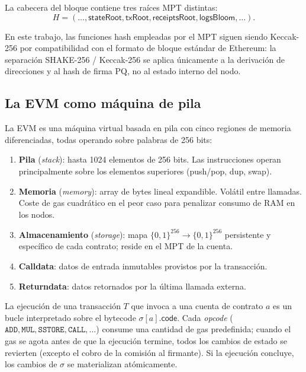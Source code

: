 La cabecera del bloque contiene tres raíces MPT distintas:
\begin{equation}
  H = (\ldots, \textsf{stateRoot}, \textsf{txRoot}, \textsf{receiptsRoot}, \textsf{logsBloom}, \ldots).
  \label{eq:header_roots}
\end{equation}

En este trabajo, las funciones hash empleadas por el MPT siguen siendo Keccak-256 por compatibilidad con el formato de bloque estándar de Ethereum: la separación SHAKE-256 / Keccak-256 se aplica únicamente a la derivación de direcciones y al hash de firma PQ, no al estado interno del nodo.

\subsection{La EVM como máquina de pila}
\label{sec:evm_arch}

La EVM es una máquina virtual basada en pila con cinco regiones de memoria diferenciadas, todas operando sobre palabras de 256 bits:

\begin{enumerate}
  \item \textbf{Pila} (\emph{stack}): hasta 1024 elementos de 256 bits. Las instrucciones operan principalmente sobre los elementos superiores (push/pop, dup, swap).
  \item \textbf{Memoria} (\emph{memory}): array de bytes lineal expandible. Volátil entre llamadas. Coste de gas cuadrático en el peor caso para penalizar consumo de RAM en los nodos.
  \item \textbf{Almacenamiento} (\emph{storage}): mapa $\{0,1\}^{256} \to \{0,1\}^{256}$ persistente y específico de cada contrato; reside en el MPT de la cuenta.
  \item \textbf{Calldata}: datos de entrada inmutables provistos por la transacción.
  \item \textbf{Returndata}: datos retornados por la última llamada externa.
\end{enumerate}

La ejecución de una transacción $T$ que invoca a una cuenta de contrato $a$ es un bucle interpretado sobre el bytecode $\sigma[a].\textsf{code}$. Cada \emph{opcode} ($\texttt{ADD}, \texttt{MUL}, \texttt{SSTORE}, \texttt{CALL}, \ldots$) consume una cantidad de gas predefinida; cuando el gas se agota antes de que la ejecución termine, todos los cambios de estado se revierten (excepto el cobro de la comisión al firmante). Si la ejecución concluye, los cambios de $\sigma$ se materializan atómicamente.

